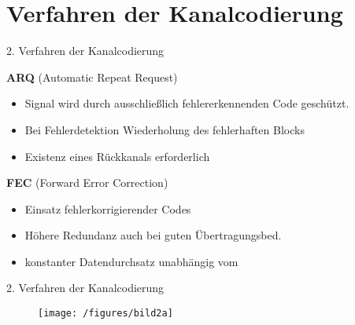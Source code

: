 \documentclass[ngerman]{beamer}
\begin{document}
\section{Verfahren der Kanalcodierung}
\begin{frame}{2. Verfahren der Kanalcodierung}

  \textbf{ARQ} (Automatic Repeat Request)

\begin{itemize}
	\item Signal wird durch ausschließlich \alert{fehlererkennenden} Code geschützt.
	\item Bei Fehlerdetektion Wiederholung des fehlerhaften Blocks
	\item Existenz eines Rückkanals erforderlich
\end{itemize}
\textbf{FEC} (Forward Error Correction)
\begin{itemize}
  	\item Einsatz \alert{fehlerkorrigierender} Codes
  	\item Höhere Redundanz auch bei guten Übertragungsbed.
  	\item konstanter Datendurchsatz unabhängig vom%

\end{itemize}
\end{frame}


\begin{frame}{2. Verfahren der Kanalcodierung}

	\begin{figure}[htbp]
 		 \centering
 		\texttt{[image: /figures/bild2a]}
	\end{figure}


\end{frame}


\end{document}
